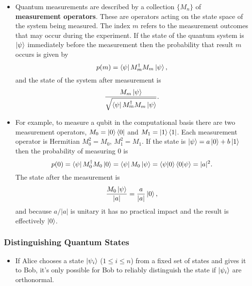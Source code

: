 \documentclass{article}
\begin{document}
\begin{itemize}
  \item Quantum measurements are described by a collection $\{M_n\}$ of \textbf{measurement operators}. These are operators acting on the state space of the system being measured. The index $m$ refers to the measurement outcomes that may occur during the experiment. If the state of the quantum system is $\ket{\psi}$ immediately before the measurement then the probability that result $m$ occurs is given by \[p(m) = \bra{\psi} M_m^\dagger M_m \ket{\psi},\] and the state of the system after measurement is \[\frac{M_m \ket{\psi}}{\sqrt{\bra{\psi} M_m^\dagger M_m \ket{\psi}}}.\]

  \item For example, to measure a qubit in the computational basis there are two measurement operators, $M_0 = \ket{0} \bra{0}$ and $M_1 = \ket{1} \bra{1}$. Each measurement operator is Hermitian $M_0^2 = M_0$, $M_1^2 = M_1$. If the state is $\ket{\psi} = a \ket{0} + b \ket{1}$ then the probability of measuring $0$ is \[p(0) = \bra{\psi} M_0^\dagger M_0 \ket{0} = \bra{\psi} M_0 \ket{\psi} = \braket{\psi | 0} \braket{0 | \psi} = |a|^2.\] The state after the measurement is \[\frac{M_0 \ket{\psi}}{|a|} = \frac{a}{|a|} \ket{0},\] and because $a / |a|$ is unitary it has no practical impact and the result is effectively $\ket{0}$.
\end{itemize}

\subsubsection{Distinguishing Quantum States}

\begin{itemize}
  \item If Alice chooses a state $\ket{\psi_i}$ ($1 \le i \le n$) from a fixed set of states and gives it to Bob, it's only possible for Bob to reliably distinguish the state if $\ket{\psi_i}$ are orthonormal.
\end{itemize}
\end{document}
